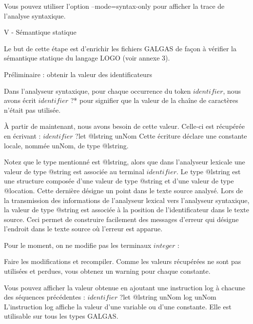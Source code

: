 Vous pouvez utiliser l'option --mode=syntax-only pour afficher la trace de l'analyse syntaxique.

V - Sémantique statique

Le but de cette étape est d'enrichir les fichiers GALGAS de façon à vérifier la sémantique statique du langage LOGO (voir annexe 3).

Préliminaire : obtenir la valeur des identificateurs

Dans l’analyseur syntaxique, pour chaque occurrence du token $identifier$, nous avons écrit $identifier$ ?* pour signifier que la valeur de la chaîne de caractères n’était pas utilisée.

À partir de maintenant, nous avons besoin de cette valeur. Celle-ci est récupérée en écrivant :
$identifier$ ?let @lstring unNom
Cette écriture déclare une constante locale, nommée unNom, de type @lstring.

Notez que le type mentionné est @lstring, alors que dans l’analyseur lexicale une valeur de type @string est associée au terminal $identifier$. Le type @lstring est une structure composée d’une valeur de type @string et d’une valeur de type @location. Cette dernière désigne un point dans le texte source analysé. Lors de la transmission des informations de l’analyseur lexical vers l’analyseur syntaxique, la valeur de type @string est associée à la position de l’identificateur dans le texte source. Ceci permet de construire facilement des messages d’erreur qui désigne l’endroit dans le texte source où l’erreur est apparue.

Pour le moment, on ne modifie pas les terminaux $integer$ :

Faire les modifications et recompiler. Comme les valeurs récupérées ne sont pas utilisées et perdues, vous obtenez un warning pour chaque constante.

Vous pouvez afficher la valeur obtenue en ajoutant une instruction log à chacune des séquences précédentes :
$identifier$ ?let @lstring unNom
log unNom
L'instruction log affiche la valeur d'une variable ou d’une constante. Elle est utilisable sur tous les types GALGAS.

